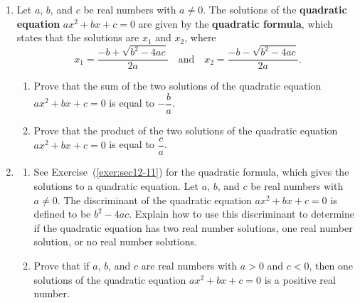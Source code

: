 \begin{enumerate}

\item  \label{exer:sec12-11}%
Let $a$, $b$, and $c$ be real numbers with $a \ne 0$.  The solutions of the \textbf{quadratic equation} 
$ax^2 + bx + c = 0$ 
%
are given by the \textbf{quadratic formula}, 
%
 which states that the solutions are $x_1$ and $x_2$, where
\[
x_1 = \frac{-b + \sqrt{b^2 - 4ac}}{2a} \quad \text{and} \quad x_2 = \frac{-b - \sqrt{b^2 - 4ac}}{2a}.
\]
\begin{enumerate}
\item Prove that the sum of the two solutions of the quadratic equation \linebreak $ax^2 + bx + c = 0$ is equal to 
$- \dfrac{b}{a}$.
\item Prove that the product of the two solutions of the quadratic equation $ax^2 + bx + c = 0$ is equal to 
$\dfrac{c}{a}$.
\end{enumerate}


\item \label{exer:sec12-quadratic2}
\begin{enumerate}
\item See Exercise~(\ref{exer:sec12-11}) for the quadratic formula, which gives the solutions to a quadratic equation.  Let $a$, $b$, and $c$ be real numbers with $a \ne 0$.  The discriminant of the quadratic equation $ax^2 + bx + c = 0$ is defined to be $b^2 - 4ac$.  Explain how to use this discriminant to determine if the quadratic equation has two real number solutions, one real number solution, or no real number solutions.

\item Prove that if $a$, $b$, and $c$ are real numbers with $a > 0$ and $c < 0$, then one solutions of the quadratic equation $ax^2 + bx + c = 0$ is a positive real number.


\end{enumerate}
\end{enumerate}
